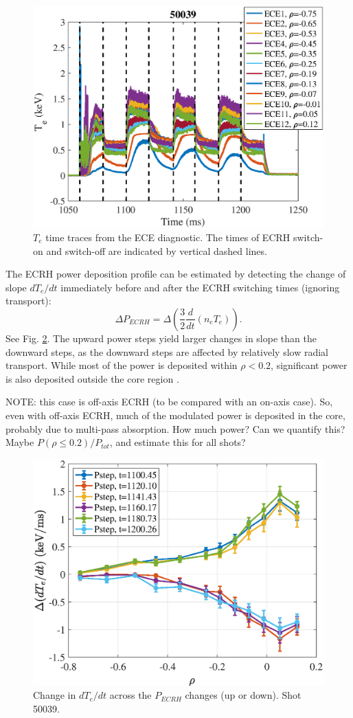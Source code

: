 \documentclass[preprint,12pt,authoryear]{elsarticle}
\begin{document}
\begin{figure}[!ht]
\centering
   \includegraphics[width=0.9\columnwidth]{Images/ECE.eps}
   \caption{$T_e$ time traces from the ECE diagnostic. The times of ECRH switch-on and switch-off are indicated by vertical dashed lines.}
   \label{Fig:ECE}
\end{figure}

The ECRH power deposition profile can be estimated by detecting the change of slope $dT_e/dt$ immediately before and after the ECRH switching times (ignoring transport): 
$$\Delta P_{ECRH} = \Delta \left ( \frac32 \frac{d}{dt}(n_eT_e) \right ).$$ 
See Fig. \ref{Fig:ECE_deposition}.
The upward power steps yield larger changes in slope than the downward steps, as the downward steps are affected by relatively slow radial transport.
While most of the power is deposited within $\rho < 0.2$, significant power is also deposited outside the core region \cite{S_Eguilior_2003}.

NOTE: this case is off-axis ECRH (to be compared with an on-axis case). So, even with off-axis ECRH, much of the modulated power is deposited in the core, probably due to multi-pass absorption.
How much power? Can we quantify this? Maybe $P(\rho\le 0.2)/P_{tot}$, and estimate this for all shots?

\begin{figure}[!ht]
\centering
   \includegraphics[width=0.5\columnwidth]{Images/ECE_power_deposition.eps}
   \caption{Change in $dT_e/dt$ across the $P_{ECRH}$ changes (up or down). Shot 50039.}
   \label{Fig:ECE_deposition}
\end{figure}
\end{document}
